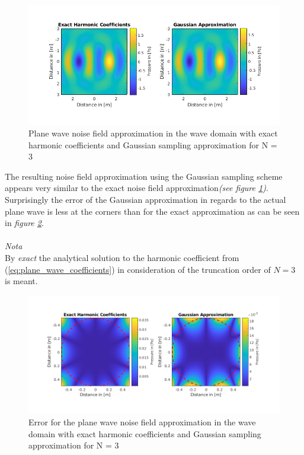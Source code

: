 \begin{figure}[H]
    \centerline{\includegraphics[width=180mm,keepaspectratio]{LaTeX/images/plots/Gauss_Approximation.png}}
    \caption{Plane wave noise field approximation in the wave domain with exact harmonic coefficients and Gaussian sampling approximation for N = 3}
    \label{fig:GaussianApproximation}
\end{figure}


The resulting noise field approximation using the Gaussian sampling scheme appears very similar to the exact noise field approximation\textit{(see figure \ref{fig:GaussianApproximation})}.\\
Surprisingly the error of the Gaussian approximation in regards to the actual plane wave is less at the corners than for the exact approximation as can be seen in \textit{figure \ref{fig:GaussianApproximationError}}.\\\\

\textit{Nota}\\
By \textit{exact} the analytical solution to the harmonic coefficient from (\ref{eq:plane_wave_coefficients}) in consideration of the truncation order of $N = 3$ is meant. 


\begin{figure}[H]
    \centerline{\includegraphics[width=180mm,keepaspectratio]{LaTeX/images/plots/Gauss_Approximation_Error.png}}
    \caption{Error for the plane wave noise field approximation in the wave domain with exact harmonic coefficients and Gaussian sampling approximation for N = 3}
    \label{fig:GaussianApproximationError}
\end{figure}

